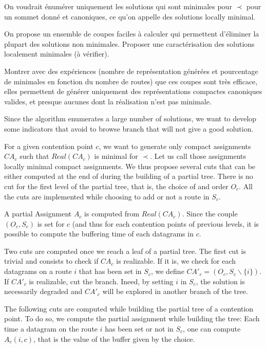 On voudrait énumérer uniquement les solutions qui sont minimales pour 
$\prec$ pour un sommet donné et canoniques, ce qu'on appelle des solutions locally minimal.

On propose un ensemble de coupes faciles à calculer qui permettent d'éliminer la plupart des solutions 
non minimales. Proposer une caractérisation des solutions localement minimales (à vérifier).

Montrer avec des expériences (nombre de représentation générées et pourcentage de minimales en fonction du nombre de routes) que ces coupes sont très efficace, elles permettent de générer uniquement des représentations compactes canoniques valides, et presque aucunes dont la réalisation n'est pas minimale.

Since the algorithm enumerates a large number of solutions, we want to develop some indicators that avoid to browse branch that will not give a good solution.

For a given contention point $c$, we want to generate only compact assignments $CA_c$ such that $Real(CA_c)$ is minimal for $\prec$. Let us call those assignments locally minimal compact assignments. We thus propose several cuts that can be either computed at the end of during the building of a partial tree. There is no cut for the first level of the partial tree, that is, the choice of and order $O_c$. All the cuts are implemented while choosing to add or not a route in $S_c$.

A partial Assignment $A_{c}$ is computed from $Real(CA_{c})$. Since the couple $(O_c,S_c)$ is set for $c$ (and thus for each contention points of previous levels, it is possible to compute the buffering time of each datagrams in $c$.

Two cuts are computed once we reach a leaf of a partial tree.
The first cut is trivial and consists to check if $CA_c$ is realizable.
If it is, we check for each datagrams on a route $i$ that has been set in $S_{c}$, we define $CA'_c = (O_c,S_c\backslash\{i\})$. If $CA'_c$ is realizable, cut the branch. Ineed, by setting $i$ in $S_c$, the solution is necessarily degraded and $CA'_c$ will be explored in another branch of the tree.


The following cuts are computed while building the partial tree of a contention point. To do so, we compute the partial assignment while building the tree: Each time a datagram on the route $i$ has been set or not in $S_c$, one can compute $A_{c}(i,c)$, that is the value of the buffer given by the choice.

